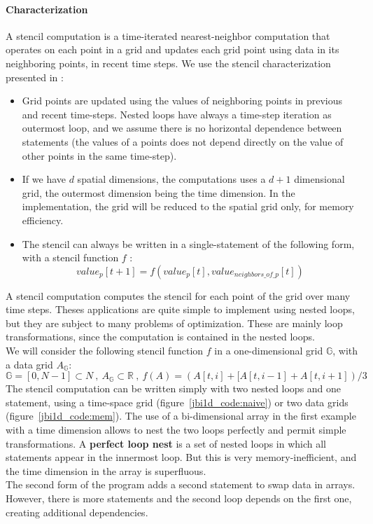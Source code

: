 \documentclass[a4paper,11pt]{article}
\begin{document}
\paragraph{Characterization}
A stencil computation is a time-iterated nearest-neighbor computation that operates on
each point in a grid and updates each grid point using data in its neighboring points, in
recent time steps. We use the stencil characterization presented in \cite{bandishti_tiling_2012} :
\begin{itemize}
 \item  Grid points are updated using the values of neighboring points in previous and recent
time-steps. Nested loops have always a time-step iteration as outermost loop, and
we assume there is no horizontal dependence between statements (the values of a
points does not depend directly on the value of other points in the same time-step).
\item If we have $d$ spatial dimensions, the computations uses a $d + 1$ dimensional grid, the
outermost dimension being the time dimension. In the implementation, the grid will
be reduced to the spatial grid only, for memory efficiency.
\item  The stencil can always be written in a single-statement of the following form, with
a stencil function $f$ :
\[value_p[t + 1] = f (value_p[t], value_{neighbors\_of\_p}[t])\]
\end{itemize}
A stencil computation computes the stencil for each point of the grid over many time
steps. Theses applications are quite simple to implement using nested loops, but they are
subject to many problems of optimization. These are mainly loop transformations, since
the computation is contained in the nested loops. \\
We will consider the following stencil function $f$ in a one-dimensional grid $\mathbb{G}$, with a data
grid $A_\mathbb{G}$:
\[\mathbb{G} = [0, N - 1] \subset N \ , \ 
A_\mathbb{G} \subset \mathbb{R} \ , \ 
f (A) = (A[t, i] + [A[t, i - 1] + A[t, i + 1])/3
\]
The stencil computation can be written simply with two nested loops and one statement,
using a time-space grid (figure~\ref{jbi1d_code:naive}) or two data grids 
(figure~\ref{jbi1d_code:mem}). The use of a bi-dimensional array in the first example
with a time dimension allows to nest the two loops perfectly and permit simple transformations. 
A \textbf{perfect loop nest} is a set of nested loops in which all statements appear in the innermost
loop.
But this is very memory-inefficient, and the time dimension in the array is superfluous. \\
The second form of the program adds a second statement to swap data in arrays. However, there 
is more statements and the second loop depends on the first one, creating additional dependencies.
\end{document}
